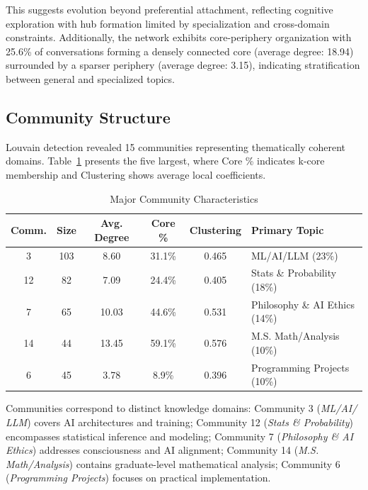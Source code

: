 \documentclass{svproc}
\begin{document}
This suggests evolution beyond preferential attachment, reflecting cognitive exploration with hub formation limited by specialization and cross-domain constraints. Additionally, the network exhibits core-periphery organization with 25.6\% of conversations forming a densely connected core (average degree: 18.94) surrounded by a sparser periphery (average degree: 3.15), indicating stratification between general and specialized topics.

\subsection{Community Structure}
\label{community_structure}

Louvain detection revealed 15 communities representing thematically coherent domains. Table~\ref{tab:communities} presents the five largest, where Core \% indicates k-core membership \cite{seidman1983} and Clustering shows average local coefficients.

\begin{table}
\centering
\caption{Major Community Characteristics}
\label{tab:communities}
\begin{tabular}{cccccl}
\toprule
\textbf{Comm.} & \textbf{Size} & \textbf{Avg. Degree} & \textbf{Core \%} & \textbf{Clustering} & \textbf{Primary Topic} \\
\midrule
3 & 103 & 8.60 & 31.1\% & 0.465 & ML/AI/LLM (23\%) \\
12 & 82 & 7.09 & 24.4\% & 0.405 & Stats \& Probability (18\%) \\
7 & 65 & 10.03 & 44.6\% & 0.531 & Philosophy \& AI Ethics (14\%) \\
14 & 44 & 13.45 & 59.1\% & 0.576 & M.S. Math/Analysis (10\%) \\
6 & 45 & 3.78 & 8.9\% & 0.396 & Programming Projects (10\%) \\
\bottomrule
\end{tabular}
\end{table}

Communities correspond to distinct knowledge domains: Community 3 (\emph{ML/AI/\\LLM}) covers AI architectures and training; Community 12 (\emph{Stats \& Probability}) encompasses statistical inference and modeling; Community 7 (\emph{Philosophy \& AI Ethics}) addresses consciousness and AI alignment; Community 14 (\emph{M.S. Math/Analysis}) contains graduate-level mathematical analysis; Community 6 (\emph{Programming Projects}) focuses on practical implementation.
\end{document}
